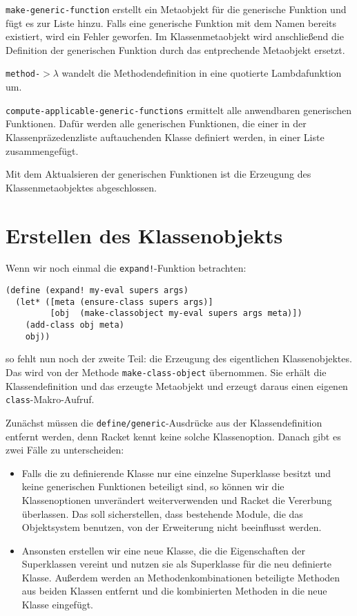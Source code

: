 \texttt{make-generic-function} erstellt ein Metaobjekt für die generische Funktion und fügt es zur Liste hinzu. Falls eine generische Funktion mit dem Namen bereits existiert, wird ein Fehler geworfen. Im Klassenmetaobjekt wird anschließend die Definition der generischen Funktion durch das entprechende Metaobjekt ersetzt.

\texttt{method-$>\lambda$} wandelt die Methodendefinition in eine quotierte Lambdafunktion um.

\texttt{compute-applicable-generic-functions} ermittelt alle anwendbaren generischen Funktionen. Dafür werden alle generischen Funktionen, die einer in der Klassenpräzedenzliste auftauchenden Klasse definiert werden, in einer Liste zusammengefügt.

Mit dem Aktualsieren der generischen Funktionen ist die Erzeugung des Klassenmetaobjektes abgeschlossen.

\section{Erstellen des Klassenobjekts}

Wenn wir noch einmal die \texttt{expand!}-Funktion betrachten:

\begin{lstlisting}
(define (expand! my-eval supers args)
  (let* ([meta (ensure-class supers args)]
         [obj  (make-classobject my-eval supers args meta)])
    (add-class obj meta)
    obj))
\end{lstlisting}

so fehlt nun noch der zweite Teil: die Erzeugung des eigentlichen Klassenobjektes. Das wird von der Methode \texttt{make-class-object} übernommen. Sie erhält die Klassendefinition und das erzeugte Metaobjekt und erzeugt daraus einen eigenen \texttt{class}-Makro-Aufruf.

Zunächst müssen die \texttt{define/generic}-Ausdrücke aus der Klassendefinition entfernt werden, denn Racket kennt keine solche Klassenoption. Danach gibt es zwei Fälle zu unterscheiden:
\begin{itemize}
 \item Falls die zu definierende Klasse nur eine einzelne Superklasse besitzt und keine generischen Funktionen beteiligt sind, so können wir die Klassenoptionen unverändert weiterverwenden und Racket die Vererbung überlassen. Das soll sicherstellen, dass bestehende Module, die das Objektsystem benutzen, von der Erweiterung nicht beeinflusst werden.
 \item Ansonsten erstellen wir eine neue Klasse, die die Eigenschaften der Superklassen vereint und nutzen sie als Superklasse für die neu definierte Klasse. Außerdem werden an  Methodenkombinationen beteiligte Methoden aus beiden Klassen entfernt und die kombinierten Methoden in die neue Klasse eingefügt.
\end{itemize}


